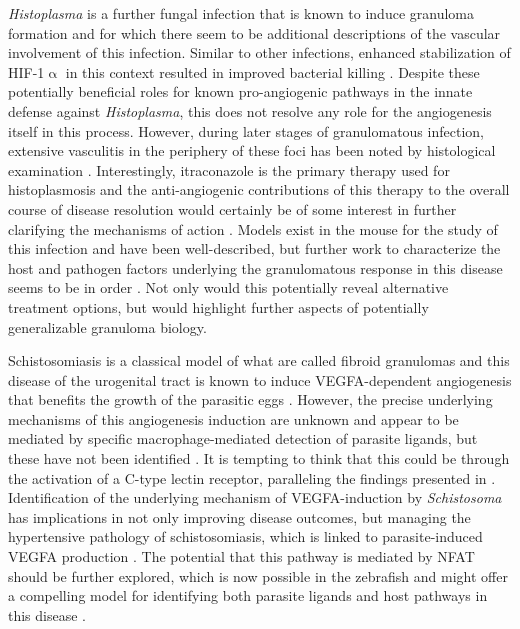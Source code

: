 \textit{Histoplasma} is a further fungal infection that is known to induce granuloma formation and for which there seem to be additional descriptions of the vascular involvement of this infection. Similar to other infections, enhanced stabilization of HIF\hyp{}1$\upalpha$ in this context resulted in improved bacterial killing \citep{Friedrich2017, Friedrich2019}. Despite these potentially beneficial roles for known pro\hyp{}angiogenic pathways in the innate defense against \textit{Histoplasma}, this does not resolve any role for the angiogenesis itself in this process. However, during later stages of granulomatous infection, extensive vasculitis in the periphery of these foci has been noted by histological examination \citep{Mann2000, Kauffman2007, Mukhopadhyay2010}. Interestingly, itraconazole is the primary therapy used for histoplasmosis and the anti\hyp{}angiogenic contributions of this therapy to the overall course of disease resolution would certainly be of some interest in further clarifying the mechanisms of action \citep{Kauffman2007}. Models exist in the mouse for the study of this infection and have been well\hyp{}described, but further work to characterize the host and pathogen factors underlying the granulomatous response in this disease seems to be in order \citep{Heninger2006}. Not only would this potentially reveal alternative treatment options, but would highlight further aspects of potentially generalizable granuloma biology.

Schistosomiasis is a classical model of what are called fibroid granulomas and this disease of the urogenital tract is known to induce VEGFA\hyp{}dependent angiogenesis that benefits the growth of the parasitic eggs \citep{Loeffler2002, Shariati2011, Pereira2013, Chabon2014, Figueiredo2015}. However, the precise underlying mechanisms of this angiogenesis induction are unknown and appear to be mediated by specific macrophage\hyp{}mediated detection of parasite ligands, but these have not been identified \citep{Loeffler2002}. It is tempting to think that this could be through the activation of a C\hyp{}type lectin receptor, paralleling the findings presented in \citet{Brewer2022}. Identification of the underlying mechanism of VEGFA\hyp{}induction by \textit{Schistosoma} has implications in not only improving disease outcomes, but managing the hypertensive pathology of schistosomiasis, which is linked to parasite\hyp{}induced VEGFA production \citep{Chabon2014}. The potential that this pathway is mediated by NFAT should be further explored, which is now possible in the zebrafish and might offer a compelling model for identifying both parasite ligands and host pathways in this disease \citep{Takaki2021}. 

